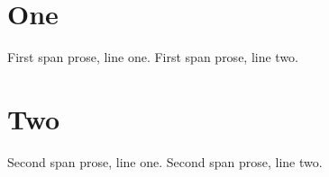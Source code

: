 \section{One}
First span prose, line one.
First span prose, line two.

\section{Two}
Second span prose, line one.
Second span prose, line two.
